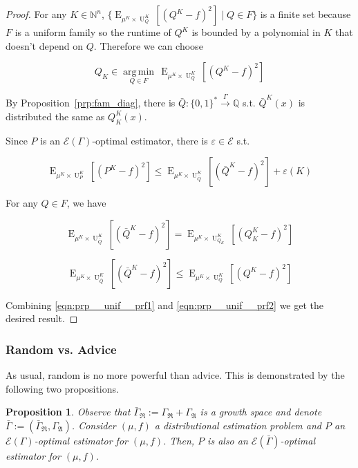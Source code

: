 \documentclass{article}
\numberwithin{equation}{section}
\theoremstyle{definition}
\theoremstyle{plain}
\newtheorem{proposition}{Proposition}[section]
\newcommand{\Bool}{\{0,1\}}
\newcommand{\Words}{{\Bool^*}}
\DeclareMathOperator{\E}{E}
\DeclareMathOperator{\Un}{U}
\newcommand{\Argmin}[1]{\underset{#1}{\operatorname{arg\,min}}\,}
\newcommand{\Nats}{\mathbb{N}}
\newcommand{\Rats}{\mathbb{Q}}
\newcommand{\GrowR}{\Gamma_{\mathfrak{R}}}
\newcommand{\GrowA}{\Gamma_{\mathfrak{A}}}
\newcommand{\Fall}{\mathcal{E}}
\newcommand{\EG}{\Fall(\Gamma)}
\newcommand{\Scheme}{\xrightarrow{\Gamma}}
\begin{document}
\begin{proof}

For any $K \in \Nats^n$, $\{\E_{\mu^{K} \times \Un_Q^{K}}[(Q^{K} - f)^2] \mid Q \in F\}$ is a finite set because $F$ is a uniform family so the runtime of $Q^{K}$ is bounded by a polynomial in $K$ that doesn't depend on $Q$. Therefore we can choose 

\[Q_{K} \in \Argmin{Q \in F} \E_{\mu^{K} \times \Un_Q^{K}}[(Q^{K} - f)^2]\]

By Proposition~\ref{prp:fam_diag}, there is $\bar{Q}: \Words \Scheme \Rats$ s.t. $\bar{Q}^{K}(x)$ is distributed the same as $Q_{K}^{K}(x)$.

Since $P$ is an $\EG$-optimal estimator, there is $\varepsilon \in \Fall$ s.t.

\begin{equation}
\label{eqn:prp__unif__prf1}
\E_{\mu^{K} \times \Un_P^{K}}[(P^{K} - f)^2] \leq \E_{\mu^{K} \times \Un_{\bar{Q}}^{K}}[(\bar{Q}^{K} - f)^2] + \varepsilon(K)
\end{equation}

For any $Q \in F$, we have 

$$\E_{\mu^{K} \times \Un_{\bar{Q}}^{K}}[(\bar{Q}^{K} - f)^2]=\E_{\mu^{K} \times \Un_{Q_{K}}^{K}}[(Q_{K}^{K} - f)^2]$$

\begin{equation}
\label{eqn:prp__unif__prf2}
\E_{\mu^{K} \times \Un_{\bar{Q}}^{K}}[(\bar{Q}^{K} - f)^2] \leq \E_{\mu^{K} \times \Un_Q^{K}}[(Q^{K} - f)^2]
\end{equation}

Combining \ref{eqn:prp__unif__prf1} and \ref{eqn:prp__unif__prf2} we get the desired result.
\end{proof}

\subsubsection{Random vs. Advice}

As usual, random is no more powerful than advice. This is demonstrated by the following two propositions.

\begin{proposition}

Observe that $\bar{\Gamma}_{\mathfrak{R}}:=\GrowR+\GrowA$ is a growth space and denote $\bar{\Gamma}:=(\bar{\Gamma}_{\mathfrak{R}},\GrowA)$. Consider $(\mu,f)$ a distributional estimation problem and $P$ an $\EG$-optimal estimator for $(\mu,f)$. Then, $P$ is also an $\Fall(\bar{\Gamma})$-optimal estimator for $(\mu,f)$.

\end{proposition}
\end{document}
